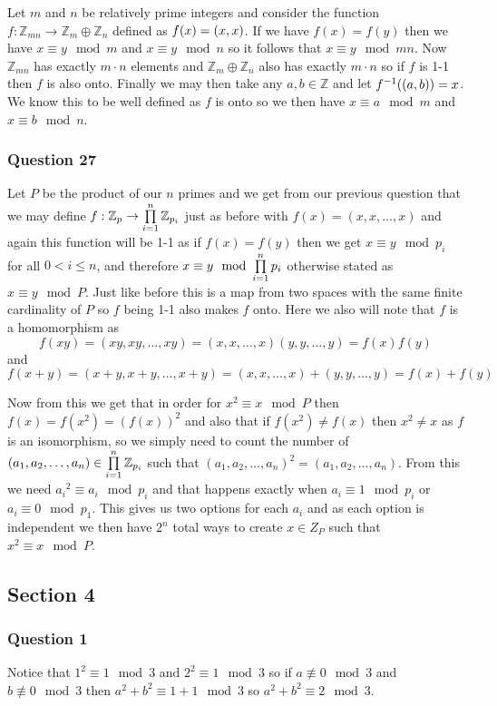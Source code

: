 \documentclass{article}
\begin{document}
Let $m$ and $n$ be relatively prime integers and consider the function $f:\mathbb Z_{mn}\to\mathbb Z_m\oplus\mathbb Z_n$ defined as $f(x) = \left( {x} , {x} \right)$. If we have $f(x) = f(y)$ then we have $x \equiv y\mod m$ and $x \equiv y \mod n$ so it follows that $x\equiv y\mod mn$. Now $\mathbb Z_{mn}$ has exactly $m\cdot n$ elements and $\mathbb Z_m\oplus \mathbb Z_n$ also has exactly $m\cdot n$ so if $f$ is 1-1 then $f$ is also onto. Finally we may then take any $a,b\in\mathbb Z$ and let ${f}^{-1}(\left( {a} , {b} \right)) = x$. We know this to be well defined as $f$ is onto so we then have $x \equiv a\mod m$ and $x\equiv b\mod n$.

\subsubsection{Question 27}


Let $P$ be the product of our $n$ primes and we get from our previous question that we may define $f:\mathbb Z_p \to \prod\limits_{i=1}^{n} {\mathbb Z_{p_i}} $ just as before with $f(x)=(x,x,\ldots,x)$ and again this function will be 1-1 as if $f(x) = f(y)$ then we get $x \equiv y \mod p_i$ for all $0<i\le n$, and therefore $x \equiv y \mod \prodfrom{i=1}{n}{p_i}$ otherwise stated as $x\equiv y\mod P$. Just like before this is a map from two spaces with the same finite cardinality of $P$ so $f$ being 1-1 also makes $f$ onto. Here we also will note that $f$ is a homomorphism as \[f(xy) = (xy,xy,\ldots,xy) = (x,x,\ldots,x)(y,y,\ldots,y)=f(x)f(y)\]  and \[f(x+y) = (x+y,x+y,\ldots,x+y)=(x,x,\ldots,x)+(y,y,\ldots,y) = f(x)+f(y)\]

Now from this we get that in order for $x^2 \equiv x\mod P$ then $f(x) = f(x^2) = (f(x))^2$ and also that if $f(x^2) \not= f(x)$ then $x^2 \not= x$ as $f$ is an isomorphism, so we simply need to count the number of $(a_1,a_2,\ldots,a_n)\in \prod\limits_{i=1}^{n} {\mathbb Z_{p_i}} $ such that $(a_1,a_2,\ldots,a_n)^2 = (a_1,a_2,\ldots,a_n)$. From this we need ${a_i}^2 \equiv a_i\mod p_i$ and that happens exactly when $a_i \equiv 1\mod p_i$ or $a_i \equiv 0\mod p_1$. This gives us two options for each $a_i$ and as each option is independent we then have $2^n$ total ways to create $x\in Z_P$ such that $x^2 \equiv x\mod P$.

\subsection{Section 4}
\subsubsection{Question 1}
Notice that $1^2 \equiv 1\mod 3$ and $2^2\equiv 1\mod3$ so if $a \not\equiv 0\mod 3$ and $b\not\equiv 0\mod 3$ then $a^2+b^2 \equiv 1+1\mod 3$ so $a^2+b^2\equiv 2\mod 3$.
\end{document}
